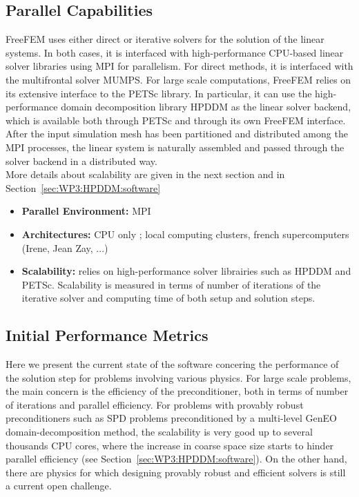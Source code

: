\subsection{Parallel Capabilities}
\label{sec:WP3:Freefem++:performances}

FreeFEM uses either direct or iterative solvers for the solution of the linear systems. In both cases, it is interfaced with high-performance CPU-based linear solver libraries using MPI for parallelism. For direct methods, it is interfaced with the multifrontal solver MUMPS. For large scale computations, FreeFEM relies on its extensive interface to the PETSc library. In particular, it can use the high-performance domain decomposition library HPDDM as the linear solver backend, which is available both through PETSc and through its own FreeFEM interface. After the input simulation mesh has been partitioned and distributed among the MPI processes, the linear system is naturally assembled and passed through the solver backend in a distributed way.\\
More details about scalability are given in the next section and in Section~\cref{sec:WP3:HPDDM:software}

\begin{itemize}
    \item \textbf{Parallel Environment:} MPI

    \item \textbf{Architectures:} CPU only ; local computing clusters, french supercomputers (Irene, Jean Zay, ...)
 
    \item \textbf{Scalability:} relies on high-performance solver librairies such as HPDDM and PETSc. Scalability is measured in terms of number of iterations of the iterative solver and computing time of both setup and solution steps.
\end{itemize}

\subsection{Initial Performance Metrics}
\label{sec:WP3:Freefem++:metrics}

Here we present the current state of the software concering the performance of the solution step for problems involving various physics. For large scale problems, the main concern is the efficiency of the preconditioner, both in terms of number of iterations and parallel efficiency. For problems with provably robust preconditioners such as SPD problems preconditioned by a multi-level GenEO domain-decomposition method, the scalability is very good up to several thousands CPU cores, where the increase in coarse space size starts to hinder parallel efficiency (see Section~\cref{sec:WP3:HPDDM:software}). On the other hand, there are physics for which designing provably robust and efficient solvers is still a current open challenge.\\

